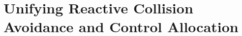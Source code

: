 \chapter{Unifying Reactive Collision Avoidance and Control Allocation}
\label{chap:collision_avoidance}


